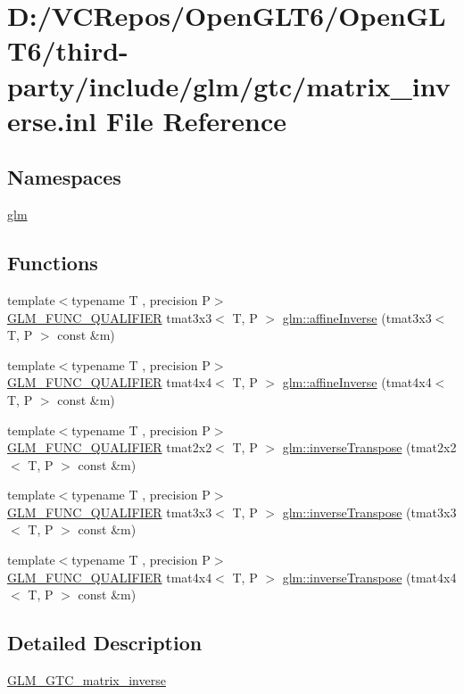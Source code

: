 \hypertarget{matrix__inverse_8inl}{}\section{D\+:/\+V\+C\+Repos/\+Open\+G\+L\+T6/\+Open\+G\+L\+T6/third-\/party/include/glm/gtc/matrix\+\_\+inverse.inl File Reference}
\label{matrix__inverse_8inl}
\subsection*{Namespaces}
\begin{DoxyCompactItemize}
\item 
 \mbox{\hyperlink{namespaceglm}{glm}}
\end{DoxyCompactItemize}
\subsection*{Functions}
\begin{DoxyCompactItemize}
\item 
{\footnotesize template$<$typename T , precision P$>$ }\\\mbox{\hyperlink{setup_8hpp_a33fdea6f91c5f834105f7415e2a64407}{G\+L\+M\+\_\+\+F\+U\+N\+C\+\_\+\+Q\+U\+A\+L\+I\+F\+I\+ER}} tmat3x3$<$ T, P $>$ \mbox{\hyperlink{namespaceglm_ae7dd7d782251f5939d55b8f8d8097d3f}{glm\+::affine\+Inverse}} (tmat3x3$<$ T, P $>$ const \&m)
\item 
{\footnotesize template$<$typename T , precision P$>$ }\\\mbox{\hyperlink{setup_8hpp_a33fdea6f91c5f834105f7415e2a64407}{G\+L\+M\+\_\+\+F\+U\+N\+C\+\_\+\+Q\+U\+A\+L\+I\+F\+I\+ER}} tmat4x4$<$ T, P $>$ \mbox{\hyperlink{namespaceglm_aae96d3c56681fe2da653a612320b5c51}{glm\+::affine\+Inverse}} (tmat4x4$<$ T, P $>$ const \&m)
\item 
{\footnotesize template$<$typename T , precision P$>$ }\\\mbox{\hyperlink{setup_8hpp_a33fdea6f91c5f834105f7415e2a64407}{G\+L\+M\+\_\+\+F\+U\+N\+C\+\_\+\+Q\+U\+A\+L\+I\+F\+I\+ER}} tmat2x2$<$ T, P $>$ \mbox{\hyperlink{namespaceglm_a926e019cbcdde3db9739b175f86b074c}{glm\+::inverse\+Transpose}} (tmat2x2$<$ T, P $>$ const \&m)
\item 
{\footnotesize template$<$typename T , precision P$>$ }\\\mbox{\hyperlink{setup_8hpp_a33fdea6f91c5f834105f7415e2a64407}{G\+L\+M\+\_\+\+F\+U\+N\+C\+\_\+\+Q\+U\+A\+L\+I\+F\+I\+ER}} tmat3x3$<$ T, P $>$ \mbox{\hyperlink{namespaceglm_a3b95ed2233ca365d49d19aea958c7f28}{glm\+::inverse\+Transpose}} (tmat3x3$<$ T, P $>$ const \&m)
\item 
{\footnotesize template$<$typename T , precision P$>$ }\\\mbox{\hyperlink{setup_8hpp_a33fdea6f91c5f834105f7415e2a64407}{G\+L\+M\+\_\+\+F\+U\+N\+C\+\_\+\+Q\+U\+A\+L\+I\+F\+I\+ER}} tmat4x4$<$ T, P $>$ \mbox{\hyperlink{namespaceglm_a38637490a036240e2fdcc490e7870a26}{glm\+::inverse\+Transpose}} (tmat4x4$<$ T, P $>$ const \&m)
\end{DoxyCompactItemize}


\subsection{Detailed Description}
\mbox{\hyperlink{group__gtc__matrix__inverse}{G\+L\+M\+\_\+\+G\+T\+C\+\_\+matrix\+\_\+inverse}} 